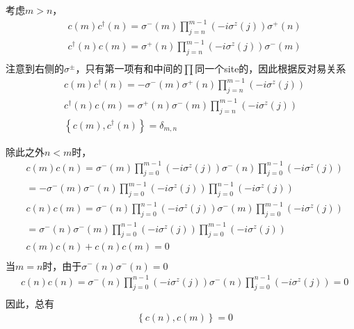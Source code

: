 考虑$m>n$，
\begin{equation}
\begin{split}
&c(m) c^{\dagger}(n) = \sigma ^-(m) \prod _{j=n}^{m-1} (-i\sigma ^z(j))\sigma ^+(n)\\
&c^{\dagger}(n) c(m) = \sigma ^+(n) \prod _{j=n}^{m-1} (-i\sigma ^z(j)) \sigma ^-(m)\\
\end{split}
\end{equation}
注意到右侧的$\sigma ^{\pm}$，只有第一项有和中间的$\prod$同一个site的，因此根据反对易关系
\begin{equation}
\begin{split}
&c(m) c^{\dagger}(n) = -\sigma ^-(m) \sigma ^+(n)\prod _{j=n}^{m-1} (-i\sigma ^z(j))\\
&c^{\dagger}(n) c(m) = \sigma ^+(n) \sigma ^-(m)\prod _{j=n}^{m-1} (-i\sigma ^z(j)) \\
&\left\{c(m),c^{\dagger}(n)\right\} = \delta _{m,n}
\end{split}
\end{equation}

除此之外$n< m$时，
\begin{equation}
\begin{split}
&c(m) c(n) = \sigma ^-(m)\prod _{j=0}^{m-1}\left(-i\sigma ^z(j)\right)\sigma ^-(n)\prod _{j=0}^{n-1}\left(-i\sigma ^z(j)\right)\\
&=-\sigma ^-(m)\sigma ^-(n)\prod _{j=0}^{m-1}\left(-i\sigma ^z(j)\right)\prod _{j=0}^{n-1}\left(-i\sigma ^z(j)\right)\\
&c(n) c(m) = \sigma ^-(n)\prod _{j=0}^{n-1}\left(-i\sigma ^z(j)\right)\sigma ^-(m)\prod _{j=0}^{m-1}\left(-i\sigma ^z(j)\right)\\
&=\sigma ^-(n)\sigma ^-(m)\prod _{j=0}^{n-1}\left(-i\sigma ^z(j)\right)\prod _{j=0}^{m-1}\left(-i\sigma ^z(j)\right)\\
&c(m) c(n)+c(n) c(m)=0\\
\end{split}
\end{equation}
当$m=n$时，由于$\sigma ^-(n)\sigma ^-(n)=0$
\begin{equation}
\begin{split}
&c(n) c(n) = \sigma ^-(n)\prod _{j=0}^{n-1}\left(-i\sigma ^z(j)\right)\sigma ^-(n)\prod _{j=0}^{n-1}\left(-i\sigma ^z(j)\right)=0\\
\end{split}
\end{equation}
因此，总有
\begin{equation}
\begin{split}
&\left\{c(n), c(m)\right\} =0\\
\end{split}
\end{equation}

